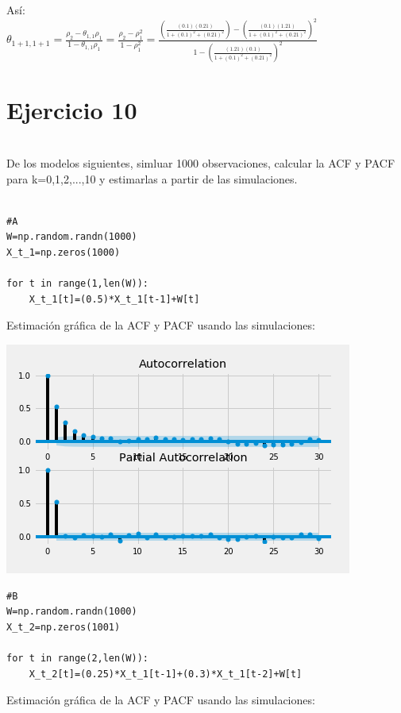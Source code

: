 \documentclass{article}
\begin{document}
As{í}:\\
$\theta_{1+1,1+1} = \frac{\rho_{2}-\theta_{1,1}\rho_{1} }{1-\theta_{1,1}\rho_{1}} = \frac{\rho_{2} -  \rho_{1}^2}{1-\rho_{1}^2} = \frac{(\frac{(0.1)(0.21)}{1+(0.1)^2+(0.21)^2})-(\frac{(0.1)(1.21)}{1+(0.1)^2+(0.21)^2})^2}{1-(\frac{(1.21)(0.1)}{1+(0.1)^2+(0.21)^2})^2} $\\

\section{Ejercicio 10}\\

De los modelos siguientes, simluar 1000 observaciones, calcular la ACF y PACF para k=0,1,2,...,10 y estimarlas a partir de las simulaciones.\\

\begin{verbatim}

#A
W=np.random.randn(1000)
X_t_1=np.zeros(1000)

for t in range(1,len(W)):
    X_t_1[t]=(0.5)*X_t_1[t-1]+W[t]

\end{verbatim} 

Estimaci{ó}n gr{á}fica de la ACF y PACF usando las simulaciones:

\includegraphics{ACF_PACF_1.png}

\begin{verbatim}
#B  
W=np.random.randn(1000)
X_t_2=np.zeros(1001)

for t in range(2,len(W)):
    X_t_2[t]=(0.25)*X_t_1[t-1]+(0.3)*X_t_1[t-2]+W[t]
\end{verbatim}    


Estimaci{ó}n gr{á}fica de la ACF y PACF usando las simulaciones:
\end{document}

